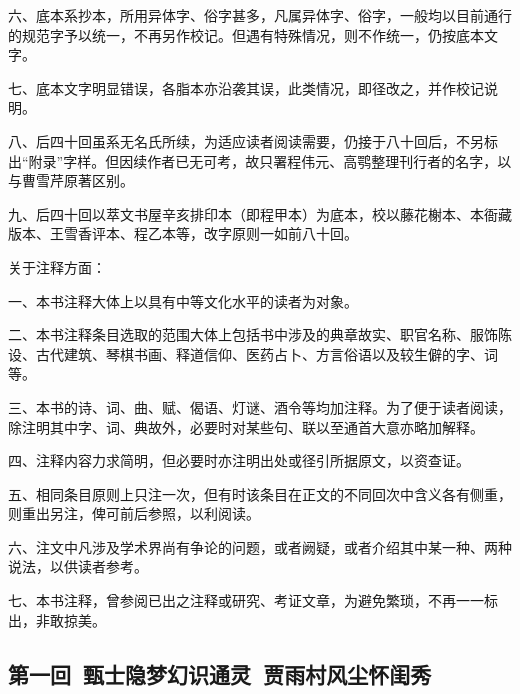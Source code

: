 \par 六、底本系抄本，所用异体字、俗字甚多，凡属异体字、俗字，一般均以目前通行的规范字予以统一，不再另作校记。但遇有特殊情况，则不作统一，仍按底本文字。
\par 七、底本文字明显错误，各脂本亦沿袭其误，此类情况，即径改之，并作校记说明。
\par 八、后四十回虽系无名氏所续，为适应读者阅读需要，仍接于八十回后，不另标出“附录”字样。但因续作者已无可考，故只署程伟元、高鹗整理刊行者的名字，以与曹雪芹原著区别。
\par 九、后四十回以萃文书屋辛亥排印本（即程甲本）为底本，校以藤花榭本、本衙藏版本、王雪香评本、程乙本等，改字原则一如前八十回。
\par 关于注释方面：
\par 一、本书注释大体上以具有中等文化水平的读者为对象。
\par 二、本书注释条目选取的范围大体上包括书中涉及的典章故实、职官名称、服饰陈设、古代建筑、琴棋书画、释道信仰、医药占卜、方言俗语以及较生僻的字、词等。
\par 三、本书的诗、词、曲、赋、偈语、灯谜、酒令等均加注释。为了便于读者阅读，除注明其中字、词、典故外，必要时对某些句、联以至通首大意亦略加解释。
\par 四、注释内容力求简明，但必要时亦注明出处或径引所据原文，以资查证。
\par 五、相同条目原则上只注一次，但有时该条目在正文的不同回次中含义各有侧重，则重出另注，俾可前后参照，以利阅读。
\par 六、注文中凡涉及学术界尚有争论的问题，或者阙疑，或者介绍其中某一种、两种说法，以供读者参考。
\par 七、本书注释，曾参阅已出之注释或研究、考证文章，为避免繁琐，不再一一标出，非敢掠美。
\par {}
\par {}
\par {}

\clearpage
\subsection*{第一回\ 甄士隐梦幻识通灵\ 贾雨村风尘怀闺秀}



